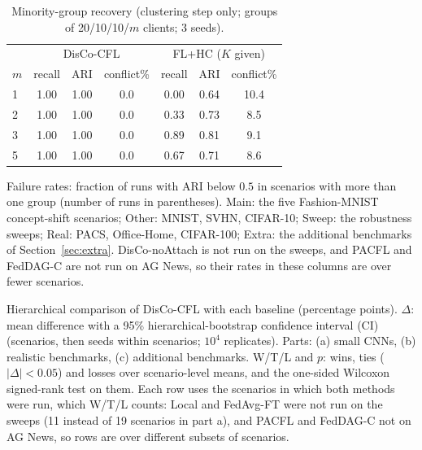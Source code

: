 \begin{table}[!htbp]
\centering
\caption{Minority-group recovery (clustering step only; groups of 20/10/10/$m$ clients; 3 seeds).}\label{tab:minority}
\small
\begin{tabular}{lcccccc}
\toprule
& \multicolumn{3}{c}{DisCo-CFL} & \multicolumn{3}{c}{FL+HC ($K$ given)} \\
\cmidrule(lr){2-4}\cmidrule(lr){5-7}
$m$ & recall & ARI & conflict\% & recall & ARI & conflict\% \\
\midrule
1 & 1.00 & 1.00 & 0.0 & 0.00 & 0.64 & 10.4\\
2 & 1.00 & 1.00 & 0.0 & 0.33 & 0.73 & 8.5\\
3 & 1.00 & 1.00 & 0.0 & 0.89 & 0.81 & 9.1\\
5 & 1.00 & 1.00 & 0.0 & 0.67 & 0.71 & 8.6\\
\bottomrule
\end{tabular}
\end{table}

\begin{table}[!htbp]
\centering
\caption{Failure rates: fraction of runs with ARI below $0.5$ in scenarios with more than one group (number of runs in parentheses). Main: the five Fashion-MNIST concept-shift scenarios; Other: MNIST, SVHN, CIFAR-10; Sweep: the robustness sweeps; Real: PACS, Office-Home, CIFAR-100; Extra: the additional benchmarks of Section~\ref{sec:extra}. DisCo-noAttach is not run on the sweeps, and PACFL and FedDAG-C are not run on AG News, so their rates in these columns are over fewer scenarios.}\label{tab:failure}

\end{table}

\begin{table}[!htbp]
\centering
\caption{Hierarchical comparison of DisCo-CFL with each baseline (percentage points). $\Delta$: mean difference with a 95\% hierarchical-bootstrap confidence interval (CI) (scenarios, then seeds within scenarios; $10^4$ replicates). Parts: (a) small CNNs, (b) realistic benchmarks, (c) additional benchmarks. W/T/L and $p$: wins, ties ($|\Delta|<0.05$) and losses over scenario-level means, and the one-sided Wilcoxon signed-rank test on them. Each row uses the scenarios in which both methods were run, which W/T/L counts: Local and FedAvg-FT were not run on the sweeps (11 instead of 19 scenarios in part a), and PACFL and FedDAG-C not on AG News, so rows are over different subsets of scenarios.}\label{tab:hier}

\end{table}

